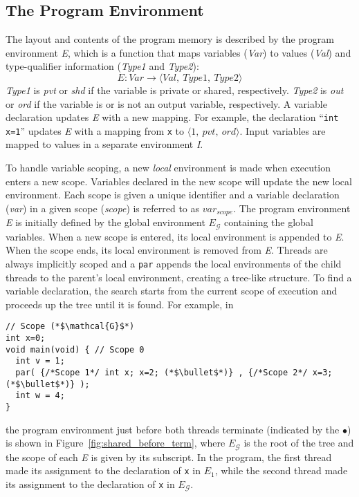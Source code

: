 
\subsection{The Program Environment}
The layout and contents of the program memory is described by 
the program environment \emph{E}, which is a function that maps 
variables (\emph{Var}) to values (\emph{Val}) and type-qualifier 
information (\emph{Type1} and \emph{Type2}):
\begin{equation*}
	E: Var \to \langle Val,~Type1,~Type2 \rangle
\end{equation*}
\emph{Type1} is \emph{pvt} or \emph{shd} if the variable is 
private or shared, respectively. \emph{Type2} is \emph{out} 
or \emph{ord} if the variable is or is not an output variable, 
respectively. A variable declaration updates \emph{E} with a
new mapping. For example, the declaration ``\verb$int x=1$'' 
updates \emph{E} with a mapping from \verb$x$ to $\langle 1,~pvt,~ord \rangle$. 
Input variables are mapped to values in a separate 
environment \emph{I}. 

To handle variable scoping, a new \emph{local} environment 
is made when execution enters a new scope. Variables declared 
in the new scope will update the new local environment. Each 
scope is given a unique identifier and a variable declaration 
(\emph{var}) in a given scope (\emph{scope}) is referred to as 
$var_{scope}$. The program environment \emph{E} is initially 
defined by the global environment $E_\mathcal{G}$ containing the 
global variables. When a new scope is entered, 
its local environment is appended to \emph{E}. When the scope 
ends, its local environment is removed from \emph{E}. 
Threads are always implicitly scoped and a \verb$par$ appends the 
local environments of the child threads to the parent's local 
environment, creating a tree-like structure. To find a variable 
declaration, the search starts from the current scope of execution 
and proceeds up the tree until it is found. For example, in
\begin{lstlisting}[style=snippet]
// Scope (*$\mathcal{G}$*)
int x=0;
void main(void) { // Scope 0
  int v = 1;
  par( {/*Scope 1*/ int x; x=2; (*$\bullet$*)} , {/*Scope 2*/ x=3; (*$\bullet$*)} );
  int w = 4;
}
\end{lstlisting}
the program environment just before both threads terminate 
(indicated by the $\bullet$) is shown in Figure~\ref{fig:shared_before_term},
where $E_\mathcal{G}$ is the root of the tree and the scope of each 
\emph{E} is given by its subscript. In the program, the first 
thread made its assignment to the declaration of \verb$x$ in $E_1$, 
while the second thread made its assignment to the declaration 
of \verb$x$ in $E_\mathcal{G}$.

